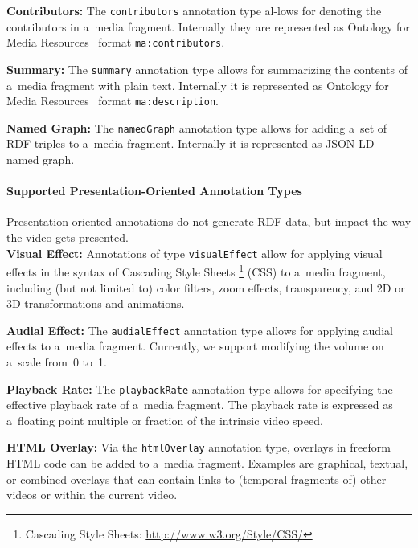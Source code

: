 \documentclass{sig-alternate}
\newcommand{\inlinelistingsize}{\fontsize{8pt}{11pt}}
\let\oldurl\url
\renewcommand{\url}[1]{\inlinelistingsize\oldurl{#1}}
\def\JSONLD{\mbox{JSON-LD}}
\begin{document}
\noindent \textbf{Contributors:} The \texttt{contributors} annotation type
  al-\linebreak lows for denoting the contributors in a~media fragment.
  Internally they are represented as
  Ontology for Media Resources~\cite{lee2012mediaontology}
  format \texttt{ma:contributors}.

\noindent \textbf{Summary:} The \texttt{summary} annotation type
  allows for summarizing the contents of a~media fragment with plain text.
  Internally it is represented as
  Ontology for Media Resources~\cite{lee2012mediaontology}
  format \texttt{ma:description}.

\noindent \textbf{Named Graph:} The \texttt{namedGraph} annotation type
  allows for adding a~set of RDF triples
  to a~media fragment.
  Internally it is represented as \JSONLD%
  ~\cite{sporny2013jsonld} named graph.

\paragraph{Supported Presentation-Oriented Annotation Types}

Presentation-oriented annotations do not generate RDF data,
but impact the way the video gets presented.\\

\noindent \textbf{Visual Effect:} Annotations of
  type \texttt{visualEffect} allow for applying visual effects
  in the syntax of Cascading Style Sheets%
  \footnote{Cascading Style Sheets:
  \url{http://www.w3.org/Style/CSS/}} (CSS)
  to a~media fragment, including (but not limited to)
  color filters, zoom effects, transparency,
  and 2D or 3D transformations and animations.

\noindent \textbf{Audial Effect:} The \texttt{audialEffect} annotation type
  allows for applying audial effects to a~media fragment.
  Currently, we support modifying the volume on a~scale
  from~0 to~1.

\noindent \textbf{Playback Rate:} The \texttt{playbackRate}
  annotation type allows for specifying the effective
  playback rate of a~media fragment.
  The playback rate is expressed as a~floating point
  multiple or fraction of the intrinsic video speed.

\noindent \textbf{HTML Overlay:} Via the \texttt{htmlOverlay}
  annotation type, overlays in
  freeform HTML code can be added to a~media fragment.
  Examples are graphical, textual, or combined overlays
  that can contain links to (temporal fragments of)
  other videos or within the current video.
\end{document}
